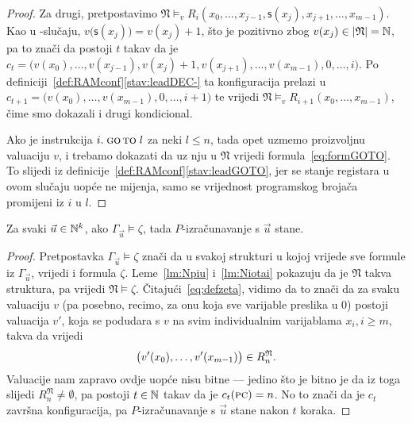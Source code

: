 \begin{proof}
Za drugi, pretpostavimo $\mathfrak N\models_v R_i(x_0,\dotsc,x_{j-1},\mathsf s(x_j),x_{j+1},\dotsc,x_{m-1})$. Kao u \inc-slučaju, $v\bigl(\mathsf s(x_j)\bigr)=v(x_j)+1$, što je pozitivno zbog $v(x_j)\in\lvert\mathfrak N\rvert={\mathbb N}$, pa to znači da postoji $t$ takav da je $c_t=\bigl(v(x_0),\dotsc,v(x_{j-1}),v(x_j)+1,v(x_{j+1}),\dotsc,v(x_{m-1}),0,\dotsc,i\bigr)$. Po definiciji~\ref{def:RAMconf}\eqref{stav:leadDEC-} ta konfiguracija prelazi u $c_{t+1}=\bigl(v(x_0),\dotsc,v(x_{m-1}),0,\dotsc,i+1\bigr)$ te vrijedi $\mathfrak N\models_v R_{i+1}(x_0,\dotsc,x_{m-1})$, čime smo dokazali i drugi kondicional.

Ako je instrukcija $i.\;\textsc{go\,to}\;l$ za neki $l\le n$, tada opet uzmemo proizvoljnu valuaciju $v$, i trebamo dokazati da uz nju u $\mathfrak N$ vrijedi formula~\eqref{eq:formGOTO}. To slijedi iz definicije~\ref{def:RAMconf}\eqref{stav:leadGOTO}, jer se stanje registara u ovom slučaju uopće ne mijenja, samo se vrijednost programskog brojača promijeni iz $i$ u $l$.
\end{proof}

\begin{propozicija}[{name=[zaključivanje povlači zaustavljanje]}]\label{pp:models>stop}
Za svaki $\vec u\in{\mathbb N}^k$, ako $\Gamma_{\vec u}\models\zeta$, tada $P$-izračunavanje s $\vec u$ stane.
\end{propozicija}
\begin{proof}
Pretpostavka $\Gamma_{\vec u}\models\zeta$ znači da u svakoj strukturi u kojoj vrijede sve formule iz $\Gamma_{\vec u}$, vrijedi i formula $\zeta$. Leme~\ref{lm:Npiu} i~\ref{lm:Niotai} pokazuju da je $\mathfrak N$ takva struktura, pa vrijedi $\mathfrak N\models\zeta$. Čitajući~\eqref{eq:defzeta}, vidimo da to znači da za svaku valuaciju $v$ (pa posebno, recimo, za onu koja sve varijable preslika u $0$) postoji valuacija $v'$, koja se podudara s $v$ na svim individualnim varijablama $x_i,i\ge m$, takva da vrijedi
\begin{equation}
	\bigl(v'(x_0),\dotsc,v'(x_{m-1})\bigr)\in R_n^{\mathfrak N}\text.
\end{equation}
	Valuacije nam zapravo ovdje uopće nisu bitne --- jedino što je bitno je da iz toga slijedi $R_n^{\mathfrak N}\ne\emptyset$, pa postoji $t\in{\mathbb N}$ takav da je $c_t(\textsc{pc})=n$. No to znači da je $c_t$ završna konfiguracija, pa $P$-izračunavanje s $\vec u$ stane nakon $t$ koraka.
\end{proof}


